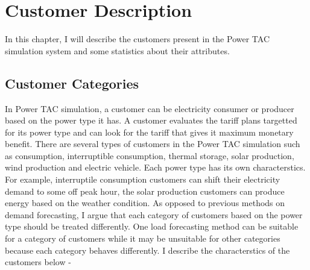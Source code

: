 
\chapter{Customer Description} 

In this chapter, I will describe the customers present in the Power TAC simulation system and some statistics about their attributes.

\section{Customer Categories}


In Power TAC simulation, a customer can be electricity consumer or producer based on the power type it has. A customer evaluates the tariff plans targetted for its power type and can look for the tariff that gives it maximum monetary benefit. There are several types of customers in the Power TAC simulation such as consumption, interruptible consumption, thermal storage, solar production, wind production and electric vehicle. Each power type has its own characterstics. For example, interruptile consumption customers can shift their electricity demand to some off peak hour, the solar production customers can produce energy based on the weather condition. As opposed to previous methods on demand forecasting, I argue that each category of customers based on the power type should be treated differently. One load forecasting method can be suitable for a category of customers while it may be unsuitable for other categories because each category behaves differently. I describe the characterstics of the customers below -

